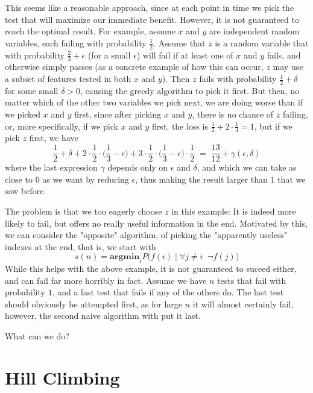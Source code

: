 \documentclass[12pt]{article}
\begin{document}
This seems like a reasonable approach, since at each point in time we pick the test that will maximize our immediate benefit. However, it is not guaranteed to reach the optimal result. For example, assume $x$ and $y$ are independent random variables, each failing with probability $\frac{1}{2}$. Assume that $z$ is a random variable that with probability $\frac{2}{3} + \epsilon$ (for a small $\epsilon$) will fail if at least one of $x$ and $y$ fails, and otherwise simply passes (as a concrete example of how this can occur, $z$ may use a subset of features tested in both $x$ and $y$). Then $z$ fails with probability $\frac{1}{2} + \delta$ for some small $\delta>0$, causing the greedy algorithm to pick it first. But then, no matter which of the other two variables we pick next, we are doing worse than if we picked $x$ and $y$ first, since after picking $x$ and $y$, there is no chance of $z$ failing, or, more specifically, if we pick $x$ and $y$ first, the loss is $\frac{1}{2} + 2 \cdot \frac{1}{4} = 1$, but if we pick $z$ first, we have
\[ \frac{1}{2} + \delta + 2 \cdot \frac{1}{2} \cdot \Bigg( \frac{1}{3} - \epsilon \Bigg) + 3 \cdot \frac{1}{2} \cdot \Bigg( \frac{1}{3} - \epsilon \Bigg) \cdot \frac{1}{2}
\; = \;
\frac{13}{12} + \gamma(\epsilon, \delta)\]
where the last expression $\gamma$ depends only on $\epsilon$ and $\delta$, and which we can take as close to $0$ as we want by reducing $\epsilon$, thus making the result larger than $1$ that we saw before.

The problem is that we too eagerly choose $z$ in this example: It is indeed more likely to fail, but offers no really useful information in the end. Motivated by this, we can consider the "opposite" algorithm, of picking the "apparently useless" indexes at the end, that is, we start with
\[ s(n) = \textbf{argmin}_{i} P\Big(f(i) \; \Big| \; \forall j \neq i \;\; \neg f(j) \Big) \]
While this helps with the above example, it is not guaranteed to suceed either, and can fail far more horribly in fact. Assume we have $n$ tests that fail with probability $1$, and a last test that fails if any of the others do. The last test should obviously be attempted first, as for large $n$ it will almost certainly fail, however, the second naive algorithm with put it last.

What can we do?

\section{Hill Climbing}
\end{document}
